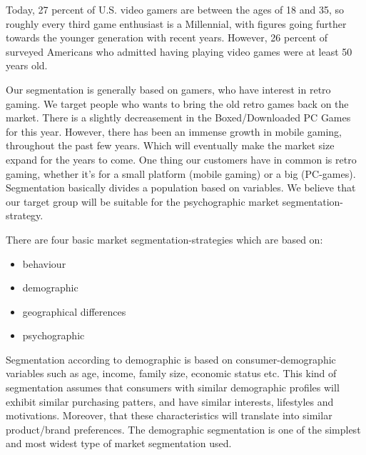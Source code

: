 \documentclass[12p]{article}
\begin{document}
\newpage
Today, 27 percent of U.S. video gamers are between the ages of 18 and 35, so roughly every third game enthusiast is a Millennial, with figures going further towards the younger generation with recent years. However, 26 percent of surveyed Americans who admitted having playing video games were at least 50 years old. \cite{VideoGamerGender}

Our segmentation is generally based on gamers, who have interest in retro gaming. We target people who wants to bring the old retro games back on the market. There is a slightly decreasement in the Boxed/Downloaded PC Games for this year. However, there has been an immense growth in mobile gaming, throughout the past few years. Which will eventually make the market size expand for the years to come. One thing our customers have in common is retro gaming, whether it's for a small platform (mobile gaming) or a big (PC-games). Segmentation basically divides a population based on variables. We believe that our target group will be suitable for the psychographic market segmentation-strategy. 

\newpage
There are four basic market segmentation-strategies which are based on: 

\begin{itemize}
    \item behaviour
\end{itemize}

\begin{itemize}
    \item demographic
\end{itemize}

\begin{itemize}
    \item geographical differences
\end{itemize}

\begin{itemize}
    \item psychographic
    \end{itemize}

Segmentation according to demographic is based on consumer-demographic variables such as age, income, family size, economic status etc. This kind of segmentation assumes that consumers with similar demographic profiles will exhibit similar purchasing patters, and have similar interests, lifestyles and motivations. Moreover, that these characteristics will translate into similar product/brand preferences. The demographic segmentation is one of the simplest and most widest type of market segmentation used. 
\end{document}
